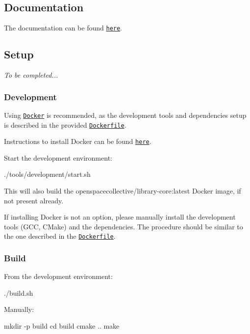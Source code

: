 \subsection*{Documentation}

The documentation can be found \href{https://open-space-collective.github.io/library-core}{\tt here}.

\subsection*{Setup}

{\itshape To be completed...}

\subsubsection*{Development}

Using \href{https://www.docker.com}{\tt Docker} is recommended, as the development tools and dependencies setup is described in the provided \href{./tools/development/docker/Dockerfile}{\tt Dockerfile}.

Instructions to install Docker can be found \href{https://docs.docker.com/install/}{\tt here}.

Start the development environment\+:


\begin{DoxyCode}
./tools/development/start.sh
\end{DoxyCode}


This will also build the {\ttfamily openspacecollective/library-\/core\+:latest} Docker image, if not present already.

If installing Docker is not an option, please manually install the development tools (G\+CC, C\+Make) and the dependencies. The procedure should be similar to the one described in the \href{./tools/development/docker/Dockerfile}{\tt Dockerfile}.

\subsubsection*{Build}

From the development environment\+:


\begin{DoxyCode}
./build.sh
\end{DoxyCode}


Manually\+:


\begin{DoxyCode}
mkdir -p build
cd build
cmake ..
make
\end{DoxyCode}


